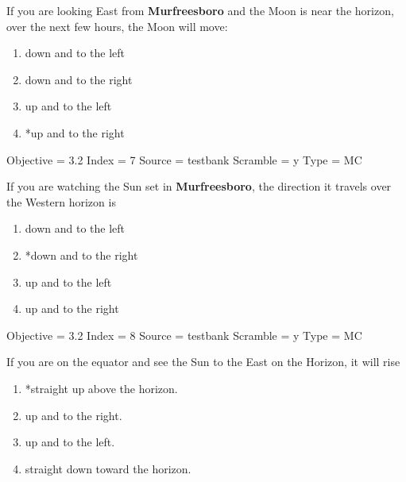 \documentclass[11pt]{article}
\begin{document}
\begin{enumerate}
\begin{minipage}{\textwidth}
\begin{minipage}{\textwidth}
\item If you are looking East from {\bf Murfreesboro} and the Moon is near the horizon, over the next few hours, the Moon will move:
\begin{multicols}{2}
\begin{enumerate} 
\setlength{\itemsep}{1pt} 
\setlength{\parskip}{0pt} 
\setlength{\parsep}{0pt}
\setlength{\multicolsep}{1pt} 
\item down and to the left
\item down and to the right
\item up and to the left
\item *up and to the right
\end{enumerate} 
\vfill 
\end{multicols}

Objective = 3.2
Index = 7
Source = testbank
Scramble = y
Type = MC
\end{minipage}
\end{minipage}
\vskip 0.20in

\begin{minipage}{\textwidth}
\begin{minipage}{\textwidth}
\item If you are watching the Sun set in {\bf Murfreesboro}, the direction it travels over the Western horizon is
\begin{multicols}{2}
\begin{enumerate} 
\setlength{\itemsep}{1pt} 
\setlength{\parskip}{0pt} 
\setlength{\parsep}{0pt}
\setlength{\multicolsep}{1pt} 
\item down and to the left
\item *down and to the right
\item up and to the left
\item up and to the right
\end{enumerate} 
\vfill 
\end{multicols}

Objective = 3.2
Index = 8
Source = testbank
Scramble = y
Type = MC
\end{minipage}
\end{minipage}
\vskip 0.20in

\begin{minipage}{\textwidth}
\begin{minipage}{\textwidth}
\item If you are on the equator and see the Sun to the East on the Horizon, it will rise
\begin{multicols}{2}
\begin{enumerate} 
\setlength{\itemsep}{1pt} 
\setlength{\parskip}{0pt} 
\setlength{\parsep}{0pt}
\setlength{\multicolsep}{1pt} 
\item *straight up above the horizon.
\item up and to the right.
\item up and to the left.
\item straight down toward the horizon.
\end{enumerate} 
\vfill 
\end{multicols}


\end{minipage}
\end{minipage}
\end{enumerate}
\end{document}
